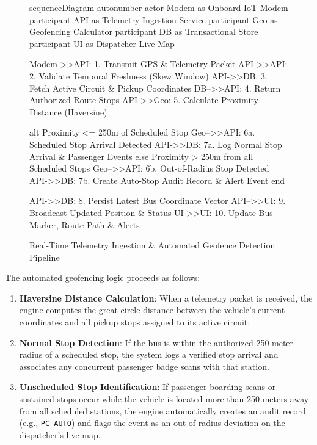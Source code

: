 \begin{figure}[H]
  \centering
  \begin{mermaid}[width=0.98\textwidth]
sequenceDiagram
    autonumber
    actor Modem as Onboard IoT Modem
    participant API as Telemetry Ingestion Service
    participant Geo as Geofencing Calculator
    participant DB as Transactional Store
    participant UI as Dispatcher Live Map

    Modem->>API: 1. Transmit GPS & Telemetry Packet
    API->>API: 2. Validate Temporal Freshness (Skew Window)
    API->>DB: 3. Fetch Active Circuit & Pickup Coordinates
    DB-->>API: 4. Return Authorized Route Stops
    API->>Geo: 5. Calculate Proximity Distance (Haversine)
    
    alt Proximity <= 250m of Scheduled Stop
        Geo-->>API: 6a. Scheduled Stop Arrival Detected
        API->>DB: 7a. Log Normal Stop Arrival & Passenger Events
    else Proximity > 250m from all Scheduled Stops
        Geo-->>API: 6b. Out-of-Radius Stop Detected
        API->>DB: 7b. Create Auto-Stop Audit Record & Alert Event
    end

    API->>DB: 8. Persist Latest Bus Coordinate Vector
    API-->>UI: 9. Broadcast Updated Position & Status
    UI->>UI: 10. Update Bus Marker, Route Path & Alerts
  \end{mermaid}
  \caption{Real-Time Telemetry Ingestion \& Automated Geofence Detection Pipeline}
  \label{fig:telemetry_geofence_seq}
\end{figure}

The automated geofencing logic proceeds as follows:
\begin{enumerate}
  \item \textbf{Haversine Distance Calculation}: When a telemetry packet is received, the engine computes the great-circle distance between the vehicle's current coordinates and all pickup stops assigned to its active circuit.
  \item \textbf{Normal Stop Detection}: If the bus is within the authorized 250-meter radius of a scheduled stop, the system logs a verified stop arrival and associates any concurrent passenger badge scans with that station.
  \item \textbf{Unscheduled Stop Identification}: If passenger boarding scans or sustained stops occur while the vehicle is located more than 250 meters away from all scheduled stations, the engine automatically creates an audit record (e.g., \texttt{PC-AUTO}) and flags the event as an out-of-radius deviation on the dispatcher's live map.
\end{enumerate}

